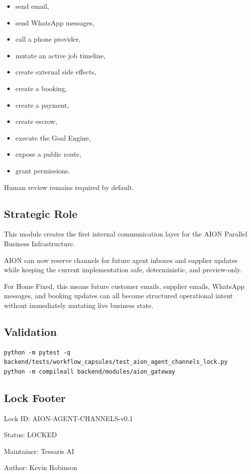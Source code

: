 \begin{itemize}
  \item send email,
  \item send WhatsApp messages,
  \item call a phone provider,
  \item mutate an active job timeline,
  \item create external side effects,
  \item create a booking,
  \item create a payment,
  \item create escrow,
  \item execute the Goal Engine,
  \item expose a public route,
  \item grant permissions.
\end{itemize}

Human review remains required by default.

\subsection{Strategic Role}

This module creates the first internal communication layer for the AION Parallel Business Infrastructure.

AION can now reserve channels for future agent inboxes and supplier updates while keeping the current implementation safe, deterministic, and preview-only.

For Home Fixed, this means future customer emails, supplier emails, WhatsApp messages, and booking updates can all become structured operational intent without immediately mutating live business state.

\subsection{Validation}

\begin{verbatim}
python -m pytest -q backend/tests/workflow_capsules/test_aion_agent_channels_lock.py
python -m compileall backend/modules/aion_gateway
\end{verbatim}

\subsection{Lock Footer}

Lock ID: AION-AGENT-CHANNELS-v0.1

Status: LOCKED

Maintainer: Tessaris AI

Author: Kevin Robinson
